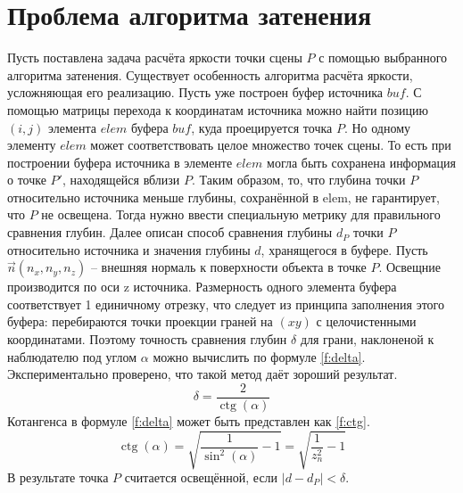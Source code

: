 \section{Проблема алгоритма затенения} {
    Пусть поставлена задача расчёта яркости точки сцены $P$ с помощью
    выбранного алгоритма затенения.
    Существует особенность алгоритма расчёта яркости, усложняющая
    его реализацию.
    Пусть уже построен буфер источника $buf$.
    С помощью матрицы перехода к координатам источника можно найти позицию
    $(i, j)$ элемента $elem$ буфера $buf$, куда проецируется точка $P$.
    Но одному элементу $elem$ может соответствовать целое множество
    точек сцены.
    То есть при построении буфера источника в элементе $elem$ могла быть
    сохранена информация о точке $P'$, находящейся вблизи $P$.
    Таким образом, то, что глубина точки $P$ относительно источника
    меньше глубины, сохранённой в elem, не гарантирует, что $P$ не освещена.
    Тогда нужно ввести специальную метрику для правильного сравнения глубин.
    Далее описан способ сравнения глубины $d_P$ точки $P$ относительно
    источника и значения глубины $d$, хранящегося в буфере.
    Пусть $\vec{n}(n_x, n_y, n_z)$ -- внешняя нормаль к поверхности объекта
    в точке $P$.
    Освещние производится по оси z источника.
    Размерность одного элемента буфера соответствует 1 единичному отрезку,
    что следует из принципа заполнения этого буфера: перебираются точки
    проекции граней на $(xy)$ с целочистенными координатами.
    Поэтому точность сравнения глубин $\delta$ для грани, наклоненой к наблюдателю под углом $\alpha$ можно вычислить по формуле \ref{f:delta}.
    Экспериментально проверено, что такой метод даёт зороший результат.
    \begin{equation}
        \label{f:delta}
        \delta = \frac{2}{\operatorname{ctg}(\alpha)}
    \end{equation}
    Котангенса в формуле \ref{f:delta} может быть представлен как \ref{f:ctg}.
    \begin{equation}
        \label{f:ctg}
        \operatorname{ctg}(\alpha) = \sqrt{\frac{1}{\sin^2(\alpha)} - 1} = \sqrt{\frac{1}{z_n^2} - 1}
    \end{equation}
    В результате точка $P$ считается освещённой, если $|d - d_P| < \delta$.
}